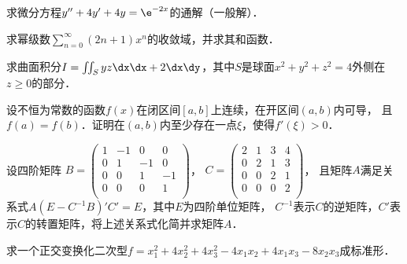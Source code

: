 \documentclass[plain,noanswer,medmath]{../../template/jnuexam}
\begin{document}
        
\begin{problem}
求微分方程$y''+4y'+4y=\e^{-2x}$的通解（一般解）．
\end{problem}



\begin{problem}
求幂级数$\sum_{n=0}^{\infty}(2n+1)x^n$的收敛域，并求其和函数．
\end{problem}



\begin{problem}
求曲面积分$I=\iint_S yz\dx\dx+2\dx\dy$，其中$S$是球面$x^2+y^2+z^2=4$外侧在$z\ge 0$的部分．
\end{problem}



\begin{problem}
设不恒为常数的函数$f(x)$在闭区间$[a,b]$上连续，在开区间$(a,b)$内可导，
且$f(a)=f(b)$．证明在$(a,b)$内至少存在一点$\xi$，使得$f'(\xi)>0$．
\end{problem}



\begin{problem}
设四阶矩阵
$B=\begin{pmatrix}
 1 & -1 &  0 &  0 \\
 0 &  1 & -1 &  0 \\
 0 &  0 &  1 & -1 \\
 0 &  0 &  0 &  1 \\
\end{pmatrix}$，
$C=\begin{pmatrix}
 2 & 1 & 3 & 4 \\
 0 & 2 & 1 & 3 \\
 0 & 0 & 2 & 1 \\
 0 & 0 & 0 & 2 \\
\end{pmatrix}$，
且矩阵$A$满足关系式\newline$A(E-C^{-1}B)'C'=E$，其中$E$为四阶单位矩阵，
$C^{-1}$表示$C$的逆矩阵，$C'$表示$C$的转置矩阵，将上述关系式化简并求矩阵$A$．
\end{problem}



\begin{problem}
求一个正交变换化二次型$f=x_1^2+4x_2^2+4x_3^2-4x_1x_2+4x_1x_3-8x_2x_3$成标准形．
\end{problem}


\end{document}
